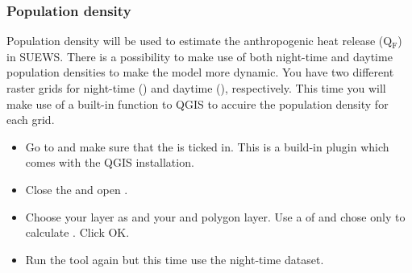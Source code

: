 \documentclass[letterpaper,10pt,english]{sphinxmanual}
\begin{document}
\subsubsection{Population density}
\label{\detokenize{Tutorials/SuewsWUDAPT:population-density}}
Population density will be used to estimate the anthropogenic heat release (Q$_{\text{F}}$) in SUEWS. There is a possibility to make use of both night-time and daytime population densities to make the model more dynamic. You have two different raster grids for night-time () and daytime (), respectively. This time you will make use of a built-in function to QGIS to accuire the population density for each grid.
\begin{itemize}
\item {} 
Go to  and make sure that the  is ticked in. This is a build-in plugin which comes with the QGIS installation.

\item {} 
Close the  and open .

\item {} 
Choose your  layer as  and your  and polygon layer. Use a  of  and chose only to calculate . Click OK.

\item {} 
Run the tool again but this time use the night-time dataset.

\end{itemize}
\end{document}
